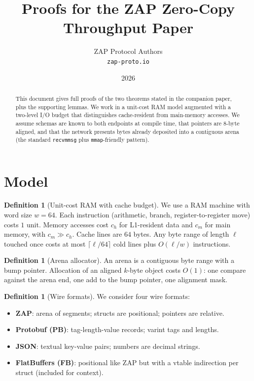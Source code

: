 \documentclass[11pt]{article}
\title{Proofs for the ZAP Zero-Copy Throughput Paper}
\author{ZAP Protocol Authors\\\texttt{zap-proto.io}}
\date{2026}
\theoremstyle{definition}
\newtheorem{definition}[theorem]{Definition}
\theoremstyle{remark}
\begin{document}
\maketitle

\begin{abstract}
This document gives full proofs of the two theorems stated in the
companion paper, plus the supporting lemmas. We work in a
unit-cost RAM model augmented with a two-level I/O budget that
distinguishes cache-resident from main-memory accesses. We assume
schemas are known to both endpoints at compile time, that pointers
are 8-byte aligned, and that the network presents bytes already
deposited into a contiguous arena (the standard \texttt{recvmmsg}
plus \texttt{mmap}-friendly pattern).
\end{abstract}

\section{Model}
\label{sec:model}

\begin{definition}[Unit-cost RAM with cache budget]
We use a RAM machine with word size $w=64$. Each instruction
(arithmetic, branch, register-to-register move) costs $1$ unit.
Memory accesses cost $c_h$ for L1-resident data and $c_m$ for main
memory, with $c_m \gg c_h$. Cache lines are $64$ bytes. Any byte
range of length $\ell$ touched once costs at most
$\lceil \ell/64 \rceil$ cold lines plus $O(\ell/w)$ instructions.
\end{definition}

\begin{definition}[Arena allocator]
An arena is a contiguous byte range with a bump pointer. Allocation
of an aligned $k$-byte object costs $O(1)$: one compare against the
arena end, one add to the bump pointer, one alignment mask.
\end{definition}

\begin{definition}[Wire formats]
We consider four wire formats:
\begin{itemize}
  \item \textbf{ZAP}: arena of segments; structs are positional;
        pointers are relative.
  \item \textbf{Protobuf (PB)}: tag-length-value records; varint tags
        and lengths.
  \item \textbf{JSON}: textual key-value pairs; numbers are decimal
        strings.
  \item \textbf{FlatBuffers (FB)}: positional like ZAP but with a
        vtable indirection per struct (included for context).
\end{itemize}
\end{definition}
\end{document}
